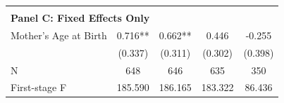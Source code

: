 \begin{table}[ht!]
{\begin{tabular}{l*{4}{c}}
\hline \\ \multicolumn{5}{l}{\textbf{Panel C: Fixed Effects Only}} \\
Mother's Age at Birth&       0.716** &       0.662** &       0.446   &      -0.255   \\
                    &     (0.337)   &     (0.311)   &     (0.302)   &     (0.398)   \\
\midrule
N                   &         648   &         646   &         635   &         350   \\
First-stage F       &     185.590   &     186.165   &     183.322   &      86.436   \\
\bottomrule \end{tabular}}\end{table}

